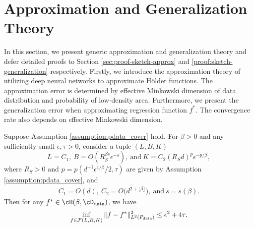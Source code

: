 \section{Approximation and Generalization Theory}\label{sec:approx}

In this section, we present generic approximation and generalization theory and defer detailed proofs to Section \ref{sec:proof-sketch-approx} and \ref{proof:sketch-generalization} respectively. Firstly, we introduce the approximation theory of utilizing deep neural networks to approximate Hölder functions. The approximation error is determined by effective Minkowski dimension of data distribution and probability of low-density area.  Furthermore, we present the generalization error when  approximating regression function $f^*$. The convergence rate also depends on effective Minkowski dimension. 

\begin{theorem}\label{lemma:approx}
    Suppose Assumption \ref{assumption:pdata_cover} hold. 
    For $\beta>0$ and any sufficiently small $\epsilon ,\tau >0$, consider a tuple $(L,B,K)$
    \begin{equation*}
        L=C_1,~ B=O(R_S^{\beta s} \epsilon^{-s}),~ \text{and} ~K=C_2 (R_S d)^p \epsilon^{-p/\beta},
    \end{equation*}
    where $R_S>0$ and $p=p(d^{-1}\epsilon^{1/\beta}/2,\tau)$ are given by Assumption \ref{assumption:pdata_cover},  and
    \begin{align*}
        C_1 = O(d),~
        C_2 = O\big( d^{2+\lfloor \beta \rfloor}\big),~\text{and} ~s=s(\beta).
    \end{align*}
    Then for any $f^* \in\cH(\beta, \cD_{\rm data})$, we have
    \begin{equation*}
        \inf_{f \in \mathcal{F}(L,B,K)} \|f-f^*\|^2_{L^2(P_{\rm data})} \leq \epsilon^2 + 4\tau.
    \end{equation*}
\end{theorem}

